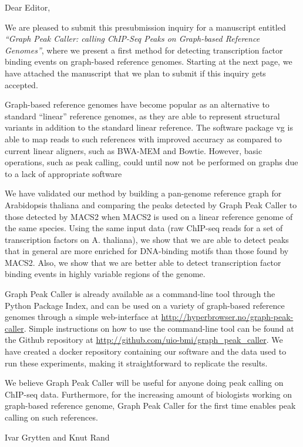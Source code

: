 \documentclass[a4paper,11pt]{letter}
\begin{document}
\begin{letter}{}

\opening{Dear Editor,}

We are pleased to submit this presubmission inquiry for a manuscript entitled \emph{“Graph Peak Caller: calling ChIP-Seq Peaks on Graph-based Reference Genomes”}, where we present a first method for detecting transcription factor binding events on graph-based reference genomes. Starting at the next page, we have attached the manuscript that we plan to submit if this inquiry gets accepted.

Graph-based reference genomes have become popular as an alternative to standard “linear” reference genomes, as they are able to represent structural variants in addition to the standard linear reference. The software package vg is able to map reads to such references with improved accuracy as compared to current linear aligners, such as BWA-MEM and Bowtie. However, basic operations, such as peak calling, could until now not be performed on graphs due to a lack of appropriate software

We have validated our method by building a pan-genome reference graph for Arabidopsis thaliana and comparing the peaks detected by Graph Peak Caller to those detected by MACS2 when MACS2 is used on a linear reference genome of the same species. Using the same input data (raw ChIP-seq reads for a set of transcription factors on A. thaliana), we show that we are able to detect peaks that in general are more enriched for DNA-binding motifs than those found by MACS2. Also, we show that we are better able to detect transcription factor binding events in highly variable regions of the genome. 

Graph Peak Caller is already available as a command-line tool through the Python Package Index, and can be used on a variety of graph-based reference genomes through a simple web-interface at \url{http://hyperbrowser.no/graph-peak-caller}. Simple instructions on how to use the command-line tool can be found at the Github repository at \url{http://github.com/uio-bmi/graph_peak_caller}. We have created a docker repository containing our software and the data used to run these experiments, making it straightforward to replicate the results.

We believe Graph Peak Caller will be useful for anyone doing peak calling on ChIP-seq data. Furthermore, for the increasing amount of biologists working on graph-based reference genome, Graph Peak Caller for the first time enables peak calling on such references.



\closing{Ivar Grytten and Knut Rand}

\end{letter}
\end{document}
